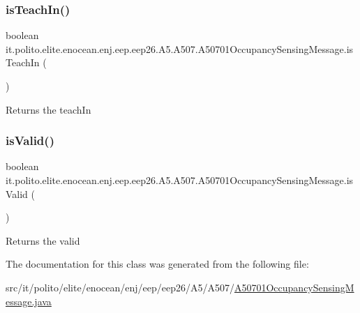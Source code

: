 \subsubsection{\texorpdfstring{is\+Teach\+In()}{isTeachIn()}}
{\footnotesize\ttfamily boolean it.\+polito.\+elite.\+enocean.\+enj.\+eep.\+eep26.\+A5.\+A507.\+A50701\+Occupancy\+Sensing\+Message.\+is\+Teach\+In (\begin{DoxyParamCaption}{ }\end{DoxyParamCaption})}

\begin{DoxyReturn}{Returns}
the teach\+In 
\end{DoxyReturn}
\hypertarget{classit_1_1polito_1_1elite_1_1enocean_1_1enj_1_1eep_1_1eep26_1_1_a5_1_1_a507_1_1_a50701_occupancy_sensing_message_a8df9451575aca8096aa615a2c11a9b7c}{}\label{classit_1_1polito_1_1elite_1_1enocean_1_1enj_1_1eep_1_1eep26_1_1_a5_1_1_a507_1_1_a50701_occupancy_sensing_message_a8df9451575aca8096aa615a2c11a9b7c} 
\subsubsection{\texorpdfstring{is\+Valid()}{isValid()}}
{\footnotesize\ttfamily boolean it.\+polito.\+elite.\+enocean.\+enj.\+eep.\+eep26.\+A5.\+A507.\+A50701\+Occupancy\+Sensing\+Message.\+is\+Valid (\begin{DoxyParamCaption}{ }\end{DoxyParamCaption})}

\begin{DoxyReturn}{Returns}
the valid 
\end{DoxyReturn}


The documentation for this class was generated from the following file\+:\begin{DoxyCompactItemize}
\item 
src/it/polito/elite/enocean/enj/eep/eep26/\+A5/\+A507/\hyperlink{_a50701_occupancy_sensing_message_8java}{A50701\+Occupancy\+Sensing\+Message.\+java}\end{DoxyCompactItemize}
